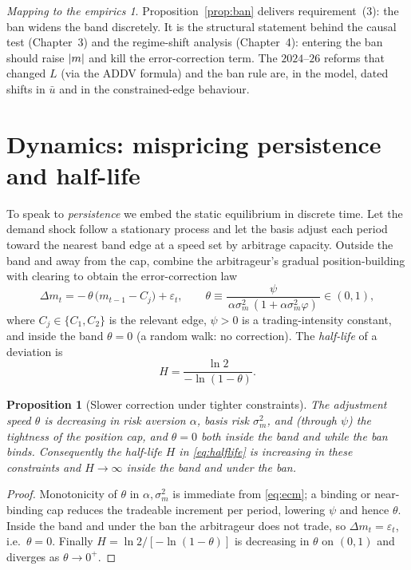 \documentclass[11pt,a4paper]{article}
\DeclarePairedDelimiter{\abs}{\lvert}{\rvert}
\theoremstyle{plain}
\newtheorem{proposition}{Proposition}
\theoremstyle{definition}
\theoremstyle{remark}
\newtheorem*{takeaway}{Mapping to the empirics}
\begin{document}
\begin{takeaway}
Proposition~\ref{prop:ban} delivers requirement~(3): the ban widens the band discretely. It is the structural statement behind the causal test (Chapter~3) and the regime-shift analysis (Chapter~4): entering the ban should raise $\abs{m}$ and kill the error-correction term. The $2024$--$26$ reforms that changed $L$ (via the ADDV formula) and the ban rule are, in the model, dated shifts in $\bar u$ and in the constrained-edge behaviour.
\end{takeaway}

\section{Dynamics: mispricing persistence and half-life}\label{sec:dyn}
To speak to \emph{persistence} we embed the static equilibrium in discrete time. Let the demand shock follow a stationary process and let the basis adjust each period toward the nearest band edge at a speed set by arbitrage capacity. Outside the band and away from the cap, combine the arbitrageur's gradual position-building with clearing to obtain the error-correction law
\begin{equation}
\Delta m_t = -\,\theta\,\big(m_{t-1}-C_j\big) + \varepsilon_t, \qquad \theta \equiv \frac{\psi}{\,\alpha\sigma_m^2\,(1+\alpha\sigma_m^2\varphi)\,}\in(0,1), \label{eq:ecm}
\end{equation}
where $C_j\in\{C_1,C_2\}$ is the relevant edge, $\psi>0$ is a trading-intensity constant, and inside the band $\theta=0$ (a random walk: no correction). The \emph{half-life} of a deviation is
\begin{equation}
H = \frac{\ln 2}{-\ln(1-\theta)}. \label{eq:halflife}
\end{equation}
\begin{proposition}[Slower correction under tighter constraints]\label{prop:dyn}
The adjustment speed $\theta$ is decreasing in risk aversion $\alpha$, basis risk $\sigma_m^2$, and (through $\psi$) the tightness of the position cap, and $\theta=0$ both inside the band and while the ban binds. Consequently the half-life $H$ in \eqref{eq:halflife} is increasing in these constraints and $H\to\infty$ inside the band and under the ban.
\end{proposition}
\begin{proof}
Monotonicity of $\theta$ in $\alpha,\sigma_m^2$ is immediate from \eqref{eq:ecm}; a binding or near-binding cap reduces the tradeable increment per period, lowering $\psi$ and hence $\theta$. Inside the band and under the ban the arbitrageur does not trade, so $\Delta m_t=\varepsilon_t$, i.e.\ $\theta=0$. Finally $H=\ln2/[-\ln(1-\theta)]$ is decreasing in $\theta$ on $(0,1)$ and diverges as $\theta\to0^+$.
\end{proof}
\end{document}
